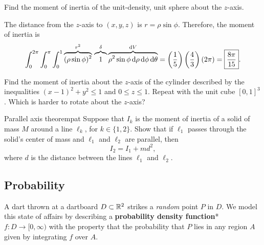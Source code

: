 \documentclass{watsonbook}
\begin{document}
\begin{example}{}{}
  Find the moment of inertia of the unit-density, unit sphere about
  the $z$-axis.
\end{example}

\begin{solution}
  The distance from the $z$-axis to $(x,y,z)$ is $r = \rho \sin
  \phi$. Therefore, the moment of inertia is
  \[
    \int_{0}^{2\pi}\int_0^\pi \int_0^1 \overbrace{(\rho \sin
      \phi)^2}^{r^2} \, \overbrace{\vphantom{\rho^2}
      1}^{\delta}\overbrace{\rho^2 \sin \phi \, \mathrm{d}\rho \, \mathrm{d}\phi \,
      \mathrm{d}\theta}^{\mathrm{d} V} = \left(\frac{1}{5}\right)
    \left(\frac{4}{3}\right) \left(2\pi\right) =
    \boxed{\frac{8\pi}{15}}.
  \]
\end{solution}

\begin{exercise}{}{}
  Find the moment of inertia about the $z$-axis of the cylinder
  described by the inequalities $(x-1)^2 + y^2 \leq 1$ and
  $0 \leq z \leq 1$. Repeat with the unit cube $[0,1]^3$. Which is
  harder to rotate about the $z$-axis?
\end{exercise}

\begin{exercise}{Parallel axis theorem}{pat}
  Suppose that $I_k$ is the moment of inertia of a solid of mass $M$
  around a line $\ell_k$, for $k\in \{1,2\}$. Show that if $\ell_1$
  passes through the solid's center of mass and $\ell_1$ and $\ell_2$
  are parallel, then
  \[
    I_2 = I_1 + md^2,
  \]
  where $d$ is the distance between the lines $\ell_1$ and $\ell_2$. 
\end{exercise}

\subsection{Probability}

A dart thrown at a dartboard $D\subset \mathbb{R}^2$ strikes a \textit{random}
point $P$ in $D$. We model this state of affairs by describing a
\textbf{probability density function}* $f:D \to [0,\infty)$ with the
property that the probability that $P$ lies in any region $A$ given by
integrating $f$ over $A$. 
\end{document}
